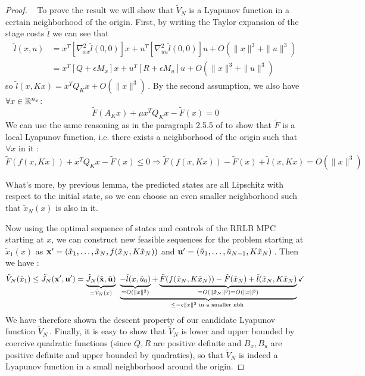 \documentclass[12pt]{article}
\begin{document}
\begin{proof}~
	To prove the result we will show that $\tilde{V}_N$ is a Lyapunov function in a certain neighborhood of the origin.
	First, by writing the Taylor expansion of the stage costs $\tilde{l}$ we can see that
	\begin{align*}
		\tilde{l}(x,u)&=x^T[\nabla_{xx}^2\tilde{l}(0,0)] x+u^T[\nabla_{uu}^2\tilde{l}(0,0)]u+O(\|x\|^3+\|u\|^3)\\
		&=x^T[Q+\epsilon M_x]x+u^T[R+\epsilon M_u]u+O(\|x\|^3+\|u\|^3)
	\end{align*}
	so $\tilde{l}(x,Kx)=x^TQ_Kx+O(\|x\|^3)$\,.
	By the second assumption, we also have $\forall x\in\R^{n_x}$:
	$$\tilde{F}(A_Kx)+\mu x^T Q_K x-\tilde{F}(x)=0$$
	We can use the same reasoning as in the paragraph 2.5.5 of \cite{MPC-book} to show that $\tilde{F}$ is a local Lyapunov function, i.e. there exists a neighborhood of the origin such that $\forall x$ in it :
	$$\tilde{F}(f(x,Kx))+x^T Q_K x-\tilde{F}(x)\leq 0\Longrightarrow\tilde{F}(f(x,Kx))-\tilde{F}(x)+\tilde{l}(x,Kx)=O(\|x\|^3)$$

	\noindent What's more, by previous lemma, the predicted states are all Lipschitz with respect to the initial state, so we can choose an even smaller neighborhood such that $\tilde{x}_N(x)$ is also in it.

	\noindent Now using the optimal sequence of states and controls of the RRLB MPC starting at $x$, we can construct new feasible sequences for the problem starting at $\tilde{x}_1(x)$ as \newline
	$\bf{x}'=(\tilde{x}_1,\dots,\tilde{x}_N,f(\tilde{x}_N,K\tilde{x}_N))$ and $\bf{u}'=(\tilde{u}_1,\dots,\tilde{u}_{N-1},K\tilde{x}_N)$\,.
	Then we have :
	$$\tilde{V}_N(\tilde{x}_1)\leq\tilde{J}_N(\bf{x}',\bf{u}')=\underbrace{\tilde{J}_N(\tilde{\bf{x}},\tilde{\bf{u}})}_{=\tilde{V}_N(x)}~\underbrace{\underbrace{-\tilde{l}(x,\tilde{u}_0)}_{=O(\|x\|^2)}+\underbrace{\tilde{F}(f(\tilde{x}_N,K\tilde{x}_N))-\tilde{F}(\tilde{x}_N)+\tilde{l}(\tilde{x}_N,K\tilde{x}_N) }_{=O(\|\tilde{x}_N\|^3)=O(\|x\|^3)} }_{\leq-c\|x\|^2\text{ in a smaller nbh }}\checkmark$$
	We have therefore shown the descent property of our candidate Lyapunov function $\tilde{V}_N$\,.
	Finally, it is easy to show that $\tilde{V}_N$ is lower and upper bounded by coercive quadratic functions (since $Q,R$ are positive definite and $B_x,B_u$ are positive definite and upper bounded by quadratics), so that $\tilde{V}_N$ is indeed a Lyapunov function in a small neighborhood around the origin.
\end{proof}
\end{document}
